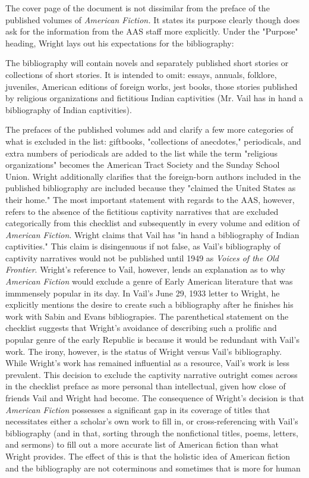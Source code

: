The cover page of the document is not dissimilar from the preface of the published volumes of \textit{American Fiction.} It states its purpose clearly though does ask for the information from the AAS staff more explicitly. Under the "Purpose" heading, Wright lays out his expectations for the bibliography: 
\begin{displayquote}
The bibliography will contain novels and separately published short stories or collections of short stories. It is intended to omit: essays, annuals, folklore, juveniles, American editions of foreign works, jest books, those stories published by religious organizations and fictitious Indian captivities (Mr. Vail has in hand a bibliography of Indian captivities). 
\end{displayquote}
The prefaces of the published volumes add and clarify a few more categories of what is excluded in the list: giftbooks, "collections of anecdotes," periodicals, and extra numbers of periodicals are added to the list while the term "religious organizations" becomes the American Tract Society and the Sunday School Union. Wright additionally clarifies that the foreign-born authors included in the published bibliography are included because they "claimed the United States as their home." \autocite[ix]{wright_american_1939} The most important statement with regards to the AAS, however, refers to the absence of the fictitious captivity narratives that are excluded categorically from this checklist and subsequently in every volume and edition of \textit{American Fiction}. Wright claims that Vail has "in hand a bibliography of Indian captivities." This claim is disingenuous if not false, as Vail's bibliography of captivity narratives would not be published until 1949 as \textit{Voices of the Old Frontier}. Wright's reference to Vail, however, lends an explanation as to why \textit{American Fiction} would exclude a genre of Early American literature that was immmensely popular in its day. In Vail's June 29, 1933 letter to Wright, he explicitly mentions the desire to create such a bibliography after he finishes his work with Sabin and Evans bibliograpies.\autocite{robert_g._vail_letter_1933} The parenthetical statement on the checklist suggests that Wright's avoidance of describing such a prolific and popular genre of the early Republic is because it would be redundant with Vail's work. The irony, however, is the status of Wright versus Vail's bibliography. While Wright's work has remained influential as a resource, Vail's work is less prevalent. This decision to exclude the captivity narrative outright comes across in the checklist preface as more personal than intellectual, given how close of friends Vail and Wright had become. The consequence of Wright's decision is that \textit{American Fiction} possesses a significant gap in its coverage of titles that necessitates either a scholar's own work to fill in, or cross-referencing with Vail's bibliography (and in that, sorting through the nonfictional titles, poems, letters, and sermons) to fill out a more accurate list of American fiction than what Wright provides. The effect of this is that the holistic idea of American fiction and the bibliography are not coterminous and sometimes that is more for human 